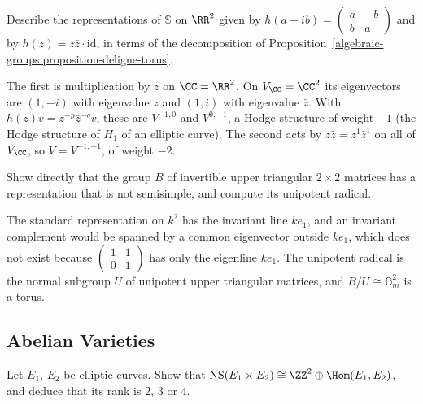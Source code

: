 \begin{exercise}\label{algebraic-groups:exercise-deligne-torus-examples}
Describe the representations of $\mathbb{S}$ on $\RR^2$ given by $h(a + ib) = \left(\begin{smallmatrix}a & -b \\ b & a\end{smallmatrix}\right)$ and by $h(z) = z\bar z \cdot \mathrm{id}$, in terms of
the decomposition of Proposition~\ref{algebraic-groups:proposition-deligne-torus}.
\end{exercise}

\begin{solution}
The first is multiplication by $z$ on $\CC = \RR^2$. On $V_\CC = \CC^2$ its eigenvectors are $(1, -i)$ with eigenvalue $z$ and $(1, i)$ with eigenvalue $\bar z$. With
$h(z)v = z^{-p}\bar z^{-q}v$, these are $V^{-1,0}$ and $V^{0,-1}$, a Hodge structure of weight $-1$ (the Hodge structure of $H_1$ of an elliptic curve). The second acts by
$z\bar z = z^1\bar z^1$ on all of $V_\CC$, so $V = V^{-1,-1}$, of weight $-2$.
\end{solution}

\begin{exercise}\label{algebraic-groups:exercise-unipotent-not-reductive}
Show directly that the group $B$ of invertible upper triangular $2 \times 2$ matrices has a representation that is not semisimple, and compute its unipotent radical.
\end{exercise}

\begin{solution}
The standard representation on $k^2$ has the invariant line $ke_1$, and an invariant complement would be spanned by a common eigenvector outside $ke_1$, which does not exist
because $\left(\begin{smallmatrix}1 & 1 \\ 0 & 1\end{smallmatrix}\right)$ has only the eigenline $ke_1$. The unipotent radical is the normal subgroup $U$ of unipotent upper triangular
matrices, and $B/U \cong \mathbb{G}_m^2$ is a torus.
\end{solution}

\subsection{Abelian Varieties}\label{algebraic-groups:subsection-exercises-abelian-varieties}

\begin{exercise}\label{algebraic-groups:exercise-ns-product}
Let $E_1$, $E_2$ be elliptic curves. Show that $\mathrm{NS}(E_1 \times E_2) \cong \ZZ^2 \oplus \Hom(E_1, E_2)$, and deduce that its rank is $2$, $3$ or $4$.
\end{exercise}


